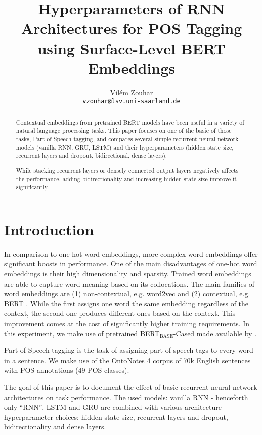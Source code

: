 \documentclass[11pt,a4paper]{article}
\title{Hyperparameters of RNN Architectures for POS Tagging using Surface-Level BERT Embeddings}
\author{Vilém Zouhar \\
  \texttt{vzouhar@lsv.uni-saarland.de}
}
\date{}
\begin{document}
\maketitle

\begin{abstract}
    Contextual embeddings from pretrained BERT models have been useful in a variety of natural language processing tasks. This paper focuses on one of the basic of those tasks, Part of Speech tagging, and compares several simple recurrent neural network models (vanilla RNN, GRU, LSTM) and their hyperparameters (hidden state size, recurrent layers and dropout, bidirectional, dense layers).
    
    While stacking recurrent layers or densely connected output layers negatively affects the performance, adding bidirectionality and increasing hidden state size improve it significantly.
\end{abstract}

\section{Introduction}

In comparison to one-hot word embeddings, more complex word embeddings offer significant boosts in performance. One of the main disadvantages of one-hot word embeddings is their high dimensionality and sparsity. Trained word embeddings are able to capture word meaning based on its collocations. The main families of word embeddings are (1) non-contextual, e.g. word2vec \cite{word2vec} and (2) contextual, e.g. BERT \cite{bert}. While the first assigns one word the same embedding regardless of the context, the second one produces different ones based on the context. This improvement comes at the cost of significantly higher training requirements. In this experiment, we make use of pretrained BERT$_\text{BASE}$-Cased made available by \citet{huggingface}.

Part of Speech tagging is the task of assigning part of speech tags to every word in a sentence. We make use of the OntoNotes 4 corpus \cite{ontonotes} of 70k English sentences with POS annotations (49 POS classes).

The goal of this paper is to document the effect of basic recurrent neural network architectures on task performance. The used models: vanilla RNN \cite{rnn} - henceforth only ``RNN'', LSTM \cite{lstm} and GRU \cite{gru} are combined with various architecture hyperparameter choices: hidden state size, recurrent layers and dropout, bidirectionality \cite{bidir} and dense layers.
\end{document}

